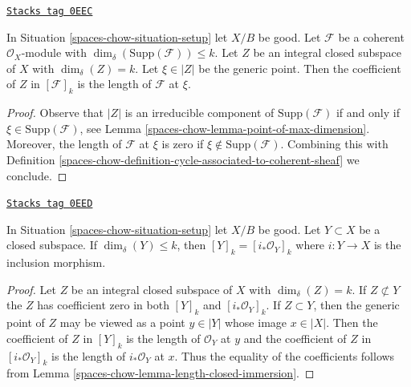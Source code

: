 \begin{lemma}
\label{spaces-chow-lemma-reformulate-coeff-coherent}
\href{https://stacks.math.columbia.edu/tag/0EEC}{\texttt{Stacks tag 0EEC}}

In Situation \ref{spaces-chow-situation-setup} let $X/B$ be good.
Let $\mathcal{F}$ be a coherent $\mathcal{O}_X$-module
with $\dim_\delta(\text{Supp}(\mathcal{F})) \leq k$.
Let $Z$ be an integral closed subspace of $X$ with $\dim_\delta(Z) = k$.
Let $\xi \in |Z|$ be the generic point.
Then the coefficient of $Z$ in $[\mathcal{F}]_k$
is the length of $\mathcal{F}$ at $\xi$.
\end{lemma}

\begin{proof}
Observe that $|Z|$ is an irreducible component of $\text{Supp}(\mathcal{F})$
if and only if $\xi \in \text{Supp}(\mathcal{F})$, see
Lemma \ref{spaces-chow-lemma-point-of-max-dimension}.
Moreover, the length of $\mathcal{F}$ at $\xi$ is zero if
$\xi \not \in \text{Supp}(\mathcal{F})$. Combining this
with Definition \ref{spaces-chow-definition-cycle-associated-to-coherent-sheaf}
we conclude.
\end{proof}

\begin{lemma}
\label{spaces-chow-lemma-cycle-closed-coherent}
\href{https://stacks.math.columbia.edu/tag/0EED}{\texttt{Stacks tag 0EED}}

In Situation \ref{spaces-chow-situation-setup} let $X/B$ be good.
Let $Y \subset X$ be a closed subspace.
If $\dim_\delta(Y) \leq k$, then $[Y]_k = [i_*\mathcal{O}_Y]_k$
where $i : Y \to X$ is the inclusion morphism.
\end{lemma}

\begin{proof}
Let $Z$ be an integral closed subspace of $X$ with $\dim_\delta(Z) = k$.
If $Z \not \subset Y$ the $Z$ has coefficient zero in both
$[Y]_k$ and $[i_*\mathcal{O}_Y]_k$. If $Z \subset Y$, then
the generic point of $Z$ may be viewed as a point $y \in |Y|$
whose image $x \in |X|$. Then the coefficient of $Z$ in
$[Y]_k$ is the length of $\mathcal{O}_Y$ at $y$ and the
coefficient of $Z$ in $[i_*\mathcal{O}_Y]_k$ is the length
of $i_*\mathcal{O}_Y$ at $x$. Thus the equality of the coefficients
follows from Lemma \ref{spaces-chow-lemma-length-closed-immersion}.
\end{proof}

